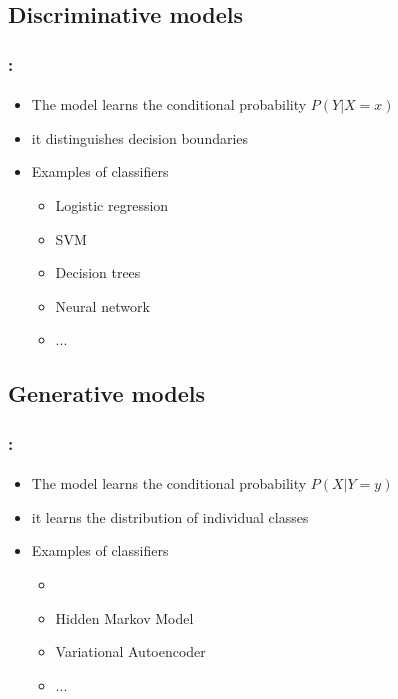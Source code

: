\documentclass[xcolor=table]{beamer}
\begin{document}
\subsection{Discriminative models}

\begin{frame}
	\frametitle{\insertshortsubtitle: \insertsection}
	\framesubtitle{\insertsubsection}
	
	\begin{itemize}
		\item The model learns the conditional probability $P(Y|X=x)$
		\item it distinguishes decision boundaries 
		\item Examples of classifiers
		\begin{itemize}
			\item Logistic regression
			\item SVM
			\item Decision trees
			\item Neural network
			\item...
		\end{itemize}
	\end{itemize}
	
\end{frame}

\subsection{Generative models}

\begin{frame}
	\frametitle{\insertshortsubtitle: \insertsection}
	\framesubtitle{\insertsubsection}

	\begin{itemize}
		\item The model learns the conditional probability $P(X|Y=y)$
		\item it learns the distribution of individual classes
		\item Examples of classifiers
		\begin{itemize}
			\item {}
			\item Hidden Markov Model
			\item Variational Autoencoder
			\item...
		\end{itemize}
	\end{itemize}
	
\end{frame}
\end{document}
